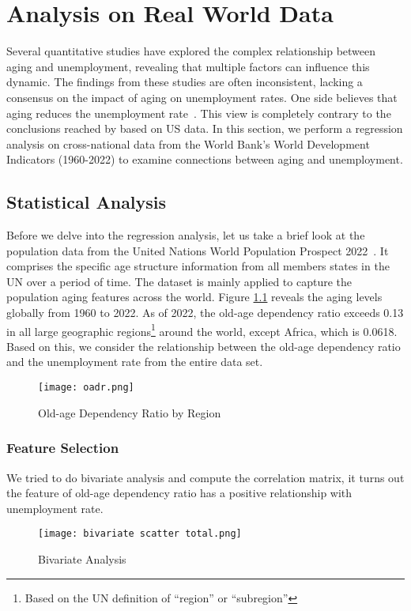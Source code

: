 \documentclass[ %
    final,
    scrbook,
    listoffigures,
    listoftables, 
    glossary]{cu-thesis}
\begin{document}
\chapter{Analysis on Real World Data}

Several quantitative studies have explored the complex relationship between aging and unemployment, revealing that multiple factors can influence this dynamic. 
The findings from these studies are often inconsistent, lacking a consensus on the impact of aging on unemployment rates. One side believes that aging reduces the unemployment rate~\cite{de2013aging,fuchs2014demography, ochsen2021age}. This view is completely contrary to the conclusions reached by \cite{shimer2001impact} based on US data.  In this section, we perform a regression analysis on cross-national data from the World Bank's World Development Indicators (1960-2022) to examine connections between aging and unemployment.

\section{Statistical Analysis}
Before we delve into the regression analysis, let us take a brief look at the population data from the United Nations World Population Prospect 2022~\cite{UN_2022}. It comprises the specific age structure information from all members states in the UN over a period of time. The dataset is mainly applied to capture the population aging features across the world.  Figure \ref{dr} reveals the aging levels globally from 1960 to 2022. As of 2022, the old-age dependency ratio exceeds 0.13 in all large geographic regions\footnote{Based on the UN definition of ``region'' or ``subregion''} around the world, except Africa, which is 0.0618. Based on this, we consider the relationship between the old-age dependency ratio and the unemployment rate from the entire data set. 
\begin{figure}[h]
\centering
\texttt{[image: oadr.png]}
\caption{Old-age Dependency Ratio by Region}
\label{dr}
\end{figure}

\iffalse
\subsection{Feature Selection}  
We tried to do bivariate analysis and compute the correlation matrix, it turns out the feature of old-age dependency ratio has a positive relationship with unemployment rate.
\begin{figure}[h]
\centering
\texttt{[image: bivariate scatter total.png]}
\caption{Bivariate Analysis}
\end{figure}
\end{document}

